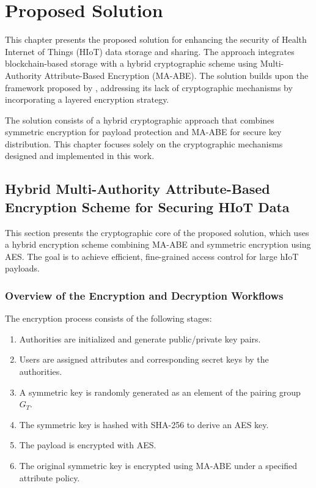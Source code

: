 \documentclass[cic,tc,english]{iiufrgs}
\begin{document}
\chapter{Proposed Solution}
    \label{chap:proposedsolution}
    This chapter presents the proposed solution for enhancing the security of Health Internet of Things (HIoT) data storage and sharing. The approach integrates blockchain-based storage with a hybrid cryptographic scheme using Multi-Authority Attribute-Based Encryption (MA-ABE). The solution builds upon the framework proposed by \citet{laura2023}, addressing its lack of cryptographic mechanisms by incorporating a layered encryption strategy.

    The solution consists of a hybrid cryptographic approach that combines symmetric encryption for payload protection and MA-ABE for secure key distribution. This chapter focuses solely on the cryptographic mechanisms designed and implemented in this work.

    \section{Hybrid Multi-Authority Attribute-Based Encryption Scheme for Securing HIoT Data}
    \label{sec:encryption}

        This section presents the cryptographic core of the proposed solution, which uses a hybrid encryption scheme combining MA-ABE and symmetric encryption using AES. The goal is to achieve efficient, fine-grained access control for large hIoT payloads.

        \subsection{Overview of the Encryption and Decryption Workflows}
            The encryption process consists of the following stages:
            \begin{enumerate}
                \item Authorities are initialized and generate public/private key pairs.
                \item Users are assigned attributes and corresponding secret keys by the authorities.
                \item A symmetric key is randomly generated as an element of the pairing group $G_T$.
                \item The symmetric key is hashed with SHA-256 to derive an AES key.
                \item The payload is encrypted with AES.
                \item The original symmetric key is encrypted using MA-ABE under a specified attribute policy.
            \end{enumerate}
\end{document}
